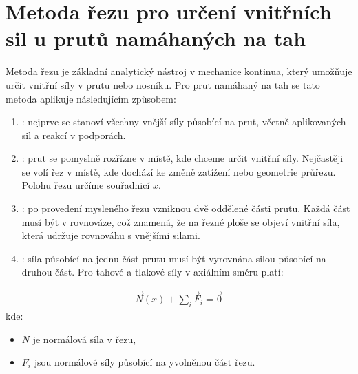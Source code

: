 \documentclass[letterpaper,10pt,english]{jupyterBook}
\begin{document}
{{\section{Metoda řezu pro určení vnitřních sil u prutů namáhaných na tah}
\label{\detokenize{Prednasky/2_5_Metoda__u0159ezu:metoda-rezu-pro-urceni-vnitrnich-sil-u-prutu-namahanych-na-tah}}
\sphinxAtStartPar
Metoda řezu je základní analytický nástroj v mechanice kontinua, který umožňuje určit vnitřní síly v prutu nebo nosníku. Pro prut namáhaný na tah se tato metoda aplikuje následujícím způsobem:
\begin{enumerate}
%
\item {} 
\sphinxAtStartPar
{}: nejprve se stanoví všechny vnější síly působící na prut, včetně aplikovaných sil a reakcí v podporách.

\item {} 
\sphinxAtStartPar
{}: prut se pomyslně rozřízne v místě, kde chceme určit vnitřní síly. Nejčastěji se volí řez v místě, kde dochází ke změně zatížení nebo geometrie průřezu. Polohu řezu určíme souřadnicí \(x\).

\item {} 
\sphinxAtStartPar
{}: po provedení mysleného řezu vzniknou dvě oddělené části prutu. Každá část musí být v rovnováze, což znamená, že na řezné ploše se objeví vnitřní síla, která udržuje rovnováhu s vnějšími silami.

\item {} 
\sphinxAtStartPar
{}: síla působící na jednu část prutu musí být vyrovnána silou působící na druhou část. Pro tahové a tlakové síly v axiálním směru platí:

\end{enumerate}
\begin{equation*}
\begin{split}
\vec{N}(x) + \sum\limits_i\vec{F}_i = \vec{0}
\end{split}
\end{equation*}
\sphinxAtStartPar
kde:
\begin{itemize}
\item {} 
\sphinxAtStartPar
\(N\) je normálová síla v řezu,

\item {} 
\sphinxAtStartPar
\(F_i\) jsou normálové síly působící na yvolněnou část řezu.


\end{itemize}}}
\end{document}
